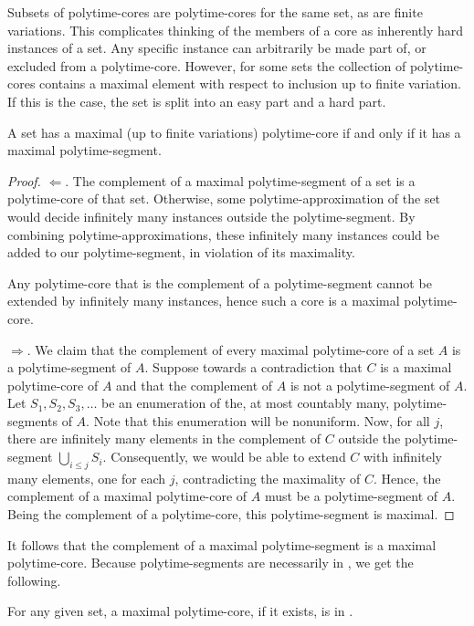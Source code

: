 Subsets of polytime-cores are polytime-cores for the same set, as are finite variations.
This complicates thinking of the members of a core as inherently hard instances of a set.
Any specific instance can arbitrarily be made part of, or excluded from a polytime-core.
However, for some sets the collection of polytime-cores contains a maximal element with respect to inclusion up to finite variation.
If this is the case, the set is split into an easy part and a hard part.
\begin{theorem}
\label{thm:maximal}%
  A set has a maximal (up to finite variations) polytime-core if and only if it has a maximal polytime-segment.
\end{theorem}
\begin{proof}
  $\Longleftarrow$.
  The complement of a maximal polytime-segment of a set is a polytime-core of that set.
  Otherwise, some polytime-approximation of the set would decide infinitely many instances outside the polytime-segment.
  By combining polytime-approximations, these infinitely many instances could be added to our polytime-segment, in violation of its maximality.

  Any polytime-core that is the complement of a polytime-segment cannot be extended by infinitely many instances, hence such a core is a maximal polytime-core.

  $\Longrightarrow$.
  We claim that the complement of every maximal polytime-core of a set $A$ is a polytime-segment of $A$.
  Suppose towards a contradiction that $C$ is a maximal polytime-core of $A$ and that the complement of $A$ is not a polytime-segment of $A$.
  Let $S_1, S_2, S_3, \ldots$ be an enumeration of the, at most countably many, polytime-segments of $A$.
  Note that this enumeration will be nonuniform.
  Now, for all $j$, there are infinitely many elements in the complement of $C$ outside the polytime-segment $\bigcup_{i \le j} S_i$.
  Consequently, we would be able to extend $C$ with infinitely many elements, one for each $j$, contradicting the maximality of $C$.
  Hence, the complement of a maximal polytime-core of $A$ must be a polytime-segment of $A$.
  Being the complement of a polytime-core, this polytime-segment is maximal.
\end{proof}

It follows that the complement of a maximal polytime-segment is a maximal polytime-core.
Because polytime-segments are necessarily in , we get the following.
\begin{corollary}
  For any given set, a maximal polytime-core, if it exists, is in .
\end{corollary}

